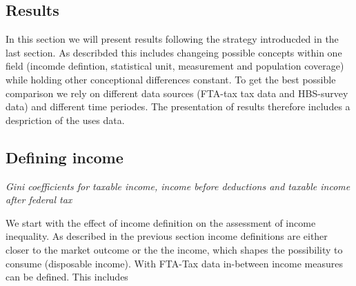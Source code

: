 \documentclass[twoside]{article}\usepackage[]{graphicx}\usepackage[]{color}
\begin{document}
\begin{multicols}{2}








\section{Results}



In this section we will present results following the strategy introducded in the last section. As describded this includes changeing possible concepts within one field (incomde defintion, statistical unit, measurement and population coverage) while holding other conceptional differences constant. To get the best possible comparison we rely on different data sources (FTA-tax tax data and HBS-survey data) and different time periodes. The presentation of results therefore includes a despriction of the uses data.

\subsection{Defining income}

\emph{Gini coefficients for taxable income, income before deductions and taxable income after federal tax}

We start with the effect of income definition on the assessment of income inequality. As described in the previous section income definitions are either closer to the market outcome or the the income, which shapes the possibility to consume (disposable income). With FTA-Tax data in-between income measures can be defined. This includes


\end{multicols}
\end{document}
